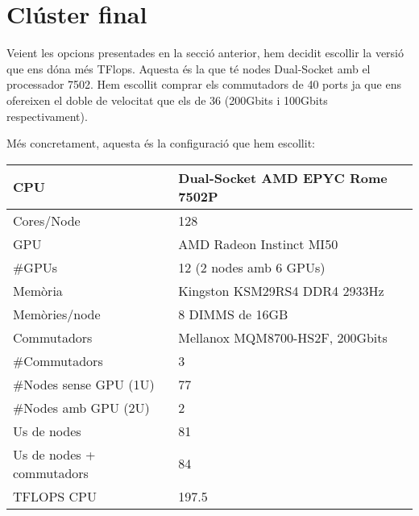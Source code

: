 \section{Clúster final}
Veient les opcions presentades en la secció anterior,  hem decidit escollir la versió que ens dóna més TFlops. Aquesta és la que té nodes Dual-Socket amb el processador 7502. Hem escollit comprar els commutadors de 40 ports ja que ens ofereixen el doble de velocitat que els de 36 (200Gbits i 100Gbits respectivament).

Més concretament, aquesta és la configuració que hem escollit:
\begin{table}[h!]
\begin{tabular}{|l|l|}
\hline
{\color[HTML]{000000} CPU}         & {\color[HTML]{000000} Dual-Socket AMD EPYC Rome 7502P} \\ \hline
Cores/Node                                       & 128                                             \\ \hline
{\color[HTML]{000000} GPU}                       & {\color[HTML]{000000} AMD Radeon Instinct MI50} \\ \hline
\#GPUs                                           & 12 (2 nodes amb 6 GPUs)                         \\ \hline
{\color[HTML]{000000} Memòria}     & {\color[HTML]{000000} Kingston KSM29RS4 DDR4 2933Hz}   \\ \hline
{\color[HTML]{000000} Memòries/node}             & {\color[HTML]{000000} 8 DIMMS de 16GB}          \\ \hline
{\color[HTML]{000000} Commutadors} & {\color[HTML]{000000} Mellanox MQM8700-HS2F, 200Gbits} \\ \hline
{\color[HTML]{000000} \#Commutadors}             & {\color[HTML]{000000} 3}                        \\ \hline
{\color[HTML]{000000} \#Nodes sense GPU (1U)}    & {\color[HTML]{000000} 77}                       \\ \hline
{\color[HTML]{000000} \#Nodes amb GPU (2U)}      & {\color[HTML]{000000} 2}                        \\ \hline
{\color[HTML]{000000} Us de nodes}               & {\color[HTML]{000000} 81}                       \\ \hline
{\color[HTML]{000000} Us de nodes + commutadors} & {\color[HTML]{000000} 84}                       \\ \hline
{\color[HTML]{000000} TFLOPS CPU}                & {\color[HTML]{000000} 197.5}                    \\ \hline

\end{tabular}
\end{table}
